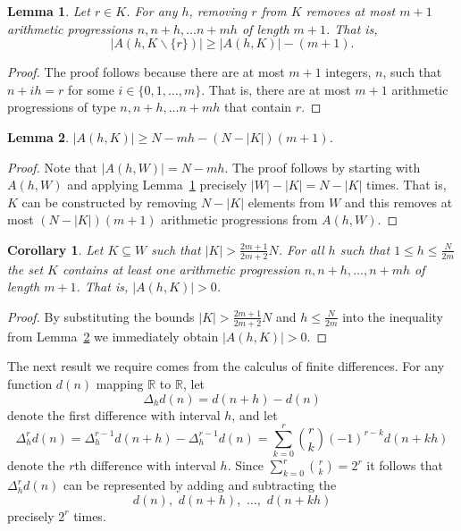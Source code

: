 \documentclass[aap,preprint]{imsart}
\newcommand{\reals}{{\mathbb R}}
\newtheorem{corollary}{Corollary}
\newtheorem{lemma}{Lemma}
\begin{document}
\begin{lemma} \label{lem:S(h,G/r)size}
Let $r \in K$.  For any $h$, removing $r$ from $K$ removes at most $m+1$ arithmetic progressions $n, n+h, \dots n+mh$ of length $m+1$.  That is,
\[
|A(h,K \backslash \{r\})| \geq |A(h,K)| - (m+1).
\]
\end{lemma}
\begin{proof}
The proof follows because there are at most $m+1$ integers, $n$, such that $n+ih = r$ for some $i \in \{0,1,\dots,m\}$.  That is, there are at most $m+1$ arithmetic progressions of type $n, n+h, \dots n+mh$ that contain $r$.
\end{proof}

 \begin{lemma} \label{lem:S(h,K)size}
 $|A(h,K)| \geq N - mh - (N - |K|)(m+1)$.
 \end{lemma}
 \begin{proof}
 Note that $|A(h,W)| = N - mh$.  The proof follows by starting with $A(h,W)$ and applying Lemma~\ref{lem:S(h,G/r)size} precisely $|W|-|K|=N-|K|$ times. That is, $K$ can be constructed by removing $N - |K|$ elements from $W$ and this removes at most $(N - |K|)(m+1)$ arithmetic progressions from $A(h,W)$.
 \end{proof}
 
 \begin{corollary} \label{cor:S(h,K)>0}
 Let $K \subseteq W$ such that $|K| > \frac{2m+1}{2m+2}N$. For all $h$ such that $1\leq h \leq\frac{N}{2m}$ the set $K$ contains at least one arithmetic progression $n, n+h, \dots, n+mh$ of length $m+1$. That is, $|A(h,K)| > 0$.
 \end{corollary}
 \begin{proof}
 By substituting the bounds $|K| > \frac{2m+1}{2m+2}N$ and $h \leq\frac{N}{2m}$ into the inequality from Lemma~\ref{lem:S(h,K)size} we immediately obtain $|A(h,K)| > 0$.
 \end{proof}

The next result we require comes from the calculus of finite differences. For any function $d(n)$ mapping $\reals$ to $\reals$, let 
\[
\Delta_h d(n) = d(n+h) - d(n)
\] 
denote the first difference with interval $h$, and let
\begin{equation}\label{eq:mthdiffformula}
\Delta_h^r d(n) = \Delta_h^{r-1} d(n+h) - \Delta_h^{r-1} d(n) = \sum_{k=0}^{r}\binom{r}{k}(-1)^{r-k}d(n+kh)
\end{equation}
denote the $r$th difference with interval $h$. Since $\sum_{k=0}^{r}\binom{r}{k} = 2^r$ it follows that $\Delta_h^r d(n)$ can be represented by adding and subtracting the 
\[
d(n), \,\, d(n+h), \,\, \dots, \,\, d(n+kh)
\] 
precisely $2^r$ times.
\end{document}
